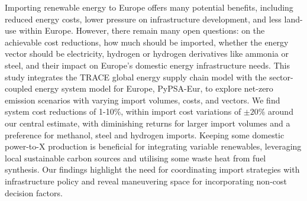 
Importing renewable energy to Europe offers many potential benefits, including
reduced energy costs, lower pressure on infrastructure development, and
less land-use within Europe.
However, there remain many open questions: on the achievable cost reductions,
how much should be imported, whether the energy vector should be electricity,
hydrogen or hydrogen derivatives like ammonia or steel, and their impact on
Europe's domestic energy infrastructure needs.
This study integrates the TRACE global energy supply chain model with the
sector-coupled energy system model for Europe, PyPSA-Eur, to explore net-zero
emission scenarios with varying import volumes, costs, and vectors.
We find system cost reductions of 1-10\%, within import cost variations of
$\pm20\%$ around our central estimate, with diminishing returns for larger
import volumes and a preference for methanol, steel and hydrogen imports.
Keeping some domestic power-to-X production is beneficial for integrating
variable renewables, leveraging local sustainable carbon sources and utilising
some waste heat from fuel synthesis.
Our findings highlight the need for coordinating import strategies with
infrastructure policy and reveal maneuvering space for incorporating non-cost
decision factors.
